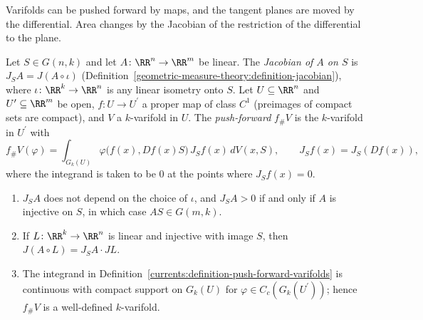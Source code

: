 Varifolds can be pushed forward by maps, and the tangent planes are moved by the differential. Area changes by the Jacobian of the restriction of the differential to the plane.

\begin{definition}\label{currents:definition-push-forward-varifolds}
Let $S \in G(n, k)$ and let $A \colon \RR^n \to \RR^m$ be linear. The \emph{Jacobian of $A$ on $S$} is $J_SA = J(A \circ \iota)$ (Definition~\ref{geometric-measure-theory:definition-jacobian}), where
$\iota \colon \RR^k \to \RR^n$ is any linear isometry onto $S$. Let $U \subseteq \RR^n$ and $U^{\prime} \subseteq \RR^m$ be open, $f \colon U \to U^{\prime}$ a proper map of class $C^1$ (preimages of compact sets
are compact), and $V$ a $k$-varifold in $U$. The \emph{push-forward} $f_\#V$ is the $k$-varifold in $U^{\prime}$ with
\[
f_\#V(\varphi) = \int_{G_k(U)}\varphi\bigl(f(x), Df(x)S\bigr)\,J_Sf(x)\,dV(x, S), \qquad J_Sf(x) = J_S(Df(x)),
\]
where the integrand is taken to be $0$ at the points where $J_Sf(x) = 0$.
\end{definition}

\begin{lemma}\label{currents:lemma-push-forward}
\begin{enumerate}
\item $J_SA$ does not depend on the choice of $\iota$, and $J_SA > 0$ if and only if $A$ is injective on $S$, in which case $AS \in G(m, k)$.
\item If $L \colon \RR^k \to \RR^n$ is linear and injective with image $S$, then $J(A \circ L) = J_SA \cdot JL$.
\item The integrand in Definition~\ref{currents:definition-push-forward-varifolds} is continuous with compact support on $G_k(U)$ for $\varphi \in C_c(G_k(U^{\prime}))$; hence $f_\#V$ is a well-defined $k$-varifold.
\end{enumerate}
\end{lemma}

